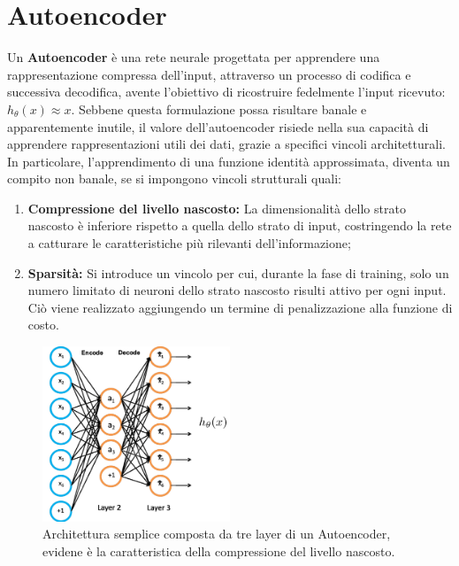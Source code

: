 \chapter{Autoencoder}

Un \textbf{Autoencoder} è una rete neurale progettata per apprendere una rappresentazione compressa dell’input, attraverso un processo di codifica e successiva decodifica, avente l’obiettivo di ricostruire fedelmente l’input ricevuto: $h_\theta (x) \approx x$. Sebbene questa formulazione possa risultare banale e apparentemente inutile, il valore dell'autoencoder risiede nella sua capacità di apprendere rappresentazioni utili dei dati, grazie a specifici vincoli architetturali. In particolare, l’apprendimento di una funzione identità approssimata, diventa un compito non banale, se si impongono vincoli strutturali quali:

\begin{enumerate}
    \item \textbf{Compressione del livello nascosto:} La dimensionalità dello strato nascosto è inferiore rispetto a quella dello strato di input, costringendo la rete a catturare le caratteristiche più rilevanti dell’informazione;
    \item \textbf{Sparsità:} Si introduce un vincolo per cui, durante la fase di training, solo un numero limitato di neuroni dello strato nascosto risulti attivo per ogni input. Ciò viene realizzato aggiungendo un termine di penalizzazione alla funzione di costo.
\end{enumerate}

\begin{figure}[h!]
\centering
\includegraphics[width=0.5\textwidth]{figure/AAutoencoder.png}
\caption{Architettura semplice composta da tre layer di un Autoencoder, evidene è la caratteristica della compressione del livello nascosto.}
\label{fig:AutoEnc}
\end{figure}


